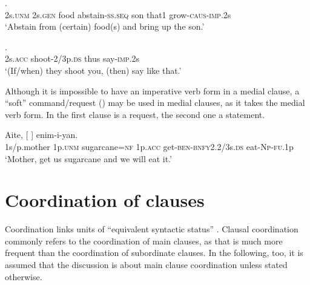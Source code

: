 \ea%
\label{ex:8:x1365}
     .\\
2s.\textsc{unm}  2s.\textsc{gen}  food  abstain-\textsc{ss}.\textsc{seq}  son  that1 grow-\textsc{caus}-\textsc{imp}.2s\\
\glt `Abstain from (certain) food(s) and bring up the son.'  
\z


\ea%
\label{ex:8:x1356}
    . \\
2s.\textsc{acc}  shoot-2/3p.\textsc{ds}  thus  say-\textsc{imp}.2s      \\
\glt `(If/when) they shoot you, (then) say like that.'
\z

Although it is impossible to have an imperative verb form in a medial clause, a ``soft'' command/request () may be used in medial clauses, as it takes the medial verb form. In  the first clause is a request, the second one a statement.

\ea%
\label{ex:8:x1366}
\gll Aite,  [      ] enim-i-yan. \\
1s/p.mother  1p.\textsc{unm}  sugarcane=\textsc{\textsc{nf}}  1p.\textsc{acc}  get-\textsc{ben}-\textsc{bnfy}2.2/3s.\textsc{ds} eat-\textsc{Np}-\textsc{fu}.1p\\
\glt `Mother, get us sugarcane and we will eat it.'
\z

\section{Coordination of clauses}

Coordination links units of ``equivalent syntactic status'' \citep[93]{Crystal1997}. Clausal coordination commonly refers to the coordination of main clauses, as that is much more frequent than the coordination of subordinate clauses. In the following, too, it is assumed that the discussion is about main clause coordination unless stated otherwise.

